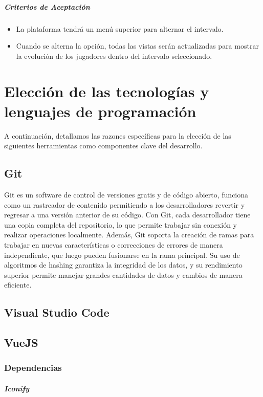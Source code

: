 \subparagraph{Criterios de Aceptación}
\begin{itemize}
    \item La plataforma tendrá un menú superior para alternar el intervalo.
    \item Cuando se alterna la opción, todas las vistas serán actualizadas para mostrar la evolución de los jugadores dentro del intervalo seleccionado.
\end{itemize}


\section{Elección de las tecnologías y lenguajes de programación}
A continuación, detallamos las razones específicas para la elección de las siguientes herramientas como componentes clave del desarrollo.

\subsection{Git}
Git es un software de control de versiones gratis y de código abierto, funciona como un rastreador de contenido permitiendo a los desarrolladores revertir y regresar a una versión anterior de su código. Con Git, cada desarrollador tiene una copia completa del repositorio, lo que permite trabajar sin conexión y realizar operaciones localmente. Además, Git soporta la creación de ramas para trabajar en nuevas características o correcciones de errores de manera independiente, que luego pueden fusionarse en la rama principal. Su uso de algoritmos de hashing garantiza la integridad de los datos, y su rendimiento superior permite manejar grandes cantidades de datos y cambios de manera eficiente.


\subsection{Visual Studio Code}


\subsection{VueJS}

\subsubsection{Dependencias}
\subparagraph{Iconify}

